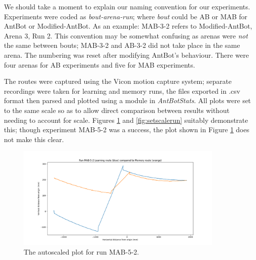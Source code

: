 \documentclass[a4paper,11pt,twoside,openright]{article}
\begin{document}
We should take a moment to explain our naming convention for our experiments. Experiments were coded as \textit{bout-arena-run}; where \textit{bout} could be
AB or MAB for AntBot or Modified-AntBot. As an example: MAB-3-2 refers to Modified-AntBot, Arena 3, Run 2. This convention may
be somewhat confusing as arenas were \textit{not} the same between bouts; MAB-3-2 and AB-3-2 did not take place in the same arena. The
numbering was reset after modifying AntBot's behaviour. There were four arenas for AB experiments and five for MAB experiments.
\newline


The routes were captured using the Vicon motion capture system; separate recordings were taken for learning and memory runs, the
files exported in .csv format then parsed and plotted using a module in \textit{AntBotStats}. All plots were set to the same scale
so as to allow direct comparison between results without needing to account for scale. Figures \ref{fig:autoscalerun} and \ref{fig:setscalerun}
suitably demonstrate this; though experiment MAB-5-2 was a success, the plot shown in Figure \ref{fig:autoscalerun} does not make this clear.

\begin{figure}
  \centering
  \includegraphics[width=0.9\textwidth]{MAB-5-2-notscaled}
  \caption{
   \label{fig:autoscalerun}The autoscaled plot for run MAB-5-2.
  }
\end{figure}
\end{document}
